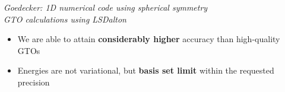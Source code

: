 \begin{frame}
\vspace{1mm}

\tiny

\it{Goedecker: 1D numerical code using spherical symmetry}\\
\it{GTO calculations using LSDalton}

\vspace{5mm}

\scriptsize

\begin{itemize}
    \item   We are able to attain \textbf{considerably higher} accuracy than 
            high-quality GTOs
    \item   Energies are not variational, but \textbf{basis set limit} within 
            the requested precision
\end{itemize}

\end{frame}

